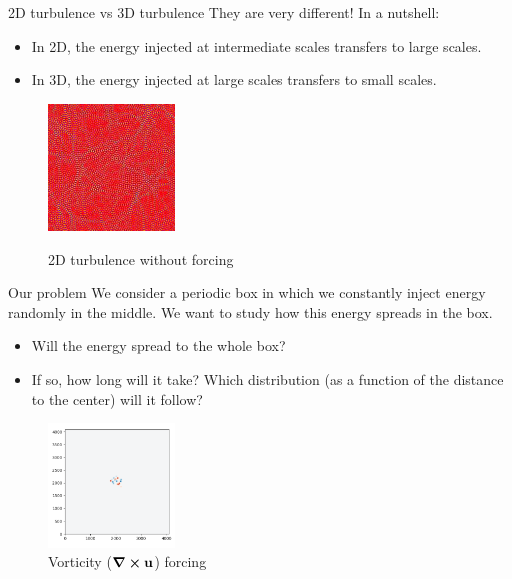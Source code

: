 \documentclass{beamer} %
\begin{document}
\begin{frame}{2D turbulence vs 3D turbulence}
	They are very different! In a nutshell:
	\begin{itemize}
		\item In 2D, the energy injected at intermediate scales transfers to large scales.
		\item In 3D, the energy injected at large scales transfers to small scales.
	\end{itemize}

	\vspace{0.3cm}
	\begin{figure}
		\centering
		\href{run:videos/condensation_small_fast.mp4}{
			\includegraphics[width=0.3\textwidth]{images/condensation_small_fast-0.png}
		}
		\caption{2D turbulence without forcing}
	\end{figure}
\end{frame}
\begin{frame}{Our problem}
	We consider a periodic box in which we constantly inject energy randomly in the middle. We want to study how this energy spreads in the box.
	\begin{itemize}
		\item Will the energy spread to the whole box?
		\item If so, how long will it take? Which distribution (as a function of the distance to the center) will it follow?
	\end{itemize}
	\begin{figure}
		\centering
		\includegraphics[width=0.3\textwidth]{images/FlowD_fw.002.png}
		\caption{Vorticity ($\curl \boldsymbol{\mathrm{u}}$) forcing}
	\end{figure}
\end{frame}
\end{document}
